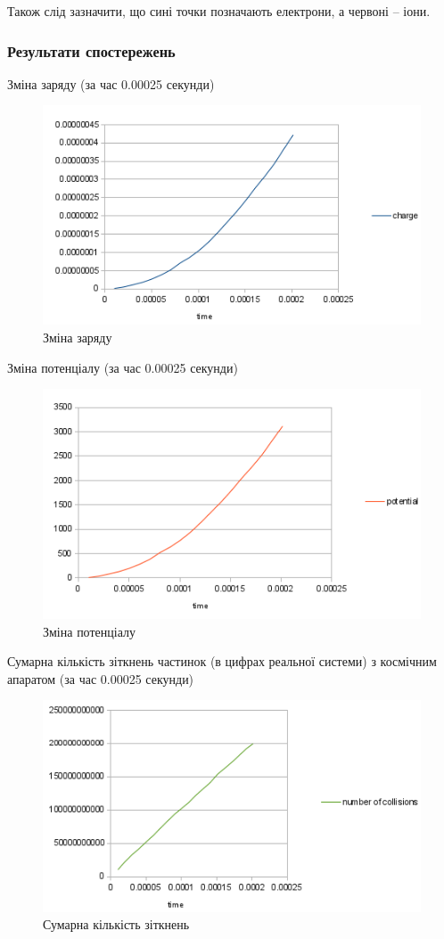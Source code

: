 \documentclass[a4paper,12pt]{article}
\begin{document}
Також слід зазначити, що сині точки позначають електрони, а червоні -- іони.

\subsubsection{Результати спостережень}
Зміна заряду (за час 0.00025 секунди)
\begin{figure}[!htp]
\centering
\includegraphics[scale=1.00]{screens/screenshot5.png}
\caption{Зміна заряду}
\end{figure}
\newpage

Зміна потенціалу (за час 0.00025 секунди)
\begin{figure}[!htp]
\centering
\includegraphics[scale=1.00]{screens/screenshot6.png}
\caption{Зміна потенціалу}
\end{figure}

Сумарна кількість зіткнень частинок (в цифрах реальної системи) з космічним апаратом (за час 0.00025 секунди)
\begin{figure}[!htp]
\centering
\includegraphics[scale=1.00]{screens/screenshot7.png}
\caption{Сумарна кількість зіткнень}
\end{figure}
\newpage
\end{document}
